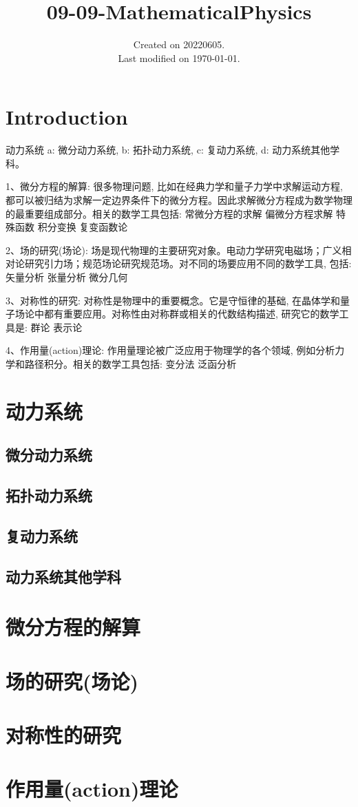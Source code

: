 \documentclass[UTF8]{../09-Mathematics}
\begin{document}
\title{09-09-MathematicalPhysics}
\date{Created on 20220605.\\   Last modified on \today.}
\maketitle
\tableofcontents


\chapter{Introduction}

动力系统
a: 微分动力系统, b: 拓扑动力系统, c: 复动力系统, d: 动力系统其他学科。



1、微分方程的解算: 很多物理问题, 比如在经典力学和量子力学中求解运动方程, 都可以被归结为求解一定边界条件下的微分方程。因此求解微分方程成为数学物理的最重要组成部分。相关的数学工具包括: 
常微分方程的求解
偏微分方程求解
特殊函数
积分变换
复变函数论


2、场的研究(场论): 场是现代物理的主要研究对象。电动力学研究电磁场；广义相对论研究引力场；规范场论研究规范场。对不同的场要应用不同的数学工具, 包括: 
矢量分析
张量分析
微分几何


3、对称性的研究: 对称性是物理中的重要概念。它是守恒律的基础, 在晶体学和量子场论中都有重要应用。对称性由对称群或相关的代数结构描述, 研究它的数学工具是: 
群论
表示论

4、作用量(action)理论: 作用量理论被广泛应用于物理学的各个领域, 例如分析力学和路径积分。相关的数学工具包括: 
变分法
泛函分析


\chapter{动力系统}

\section{微分动力系统}
\section{拓扑动力系统}
\section{复动力系统}
\section{动力系统其他学科}


\chapter{微分方程的解算}
\chapter{场的研究(场论)}
\chapter{对称性的研究}
\chapter{作用量(action)理论}
\end{document}
